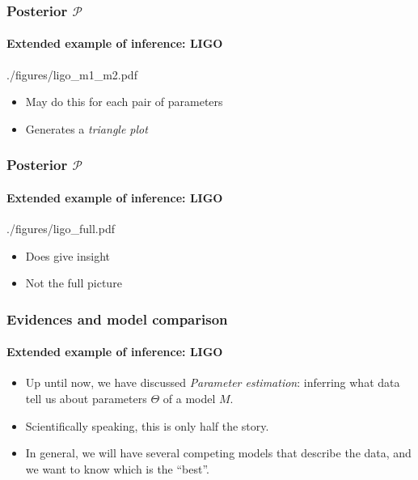 \documentclass[%
]{beamer}
\begin{document}
\begin{frame}
    \frametitle{Posterior $\mathcal{P}$}
    \framesubtitle{Extended example of inference: LIGO}

    \begin{figleft}[0.65]{./figures/ligo_m1_m2.pdf}
        \begin{itemize}
            \item May do this for each pair of parameters
            \item Generates a {\em triangle plot}
        \end{itemize}
    \end{figleft}

\end{frame}

\begin{frame}
    \frametitle{Posterior $\mathcal{P}$}
    \framesubtitle{Extended example of inference: LIGO}
    \begin{figleft}[0.65]{./figures/ligo_full.pdf}
		\begin{itemize}
          \item Does give insight
          \item Not the full picture
		\end{itemize}
    \end{figleft}
\end{frame}

\begin{frame}
    \frametitle{Evidences and model comparison}
    \framesubtitle{Extended example of inference: LIGO}

    \begin{itemize}
        \item Up until now, we have discussed {\em Parameter estimation\/}: inferring what data tell us about parameters $\Theta$ of a model $M$.
        \item Scientifically speaking, this is only half the story.
        \item In general, we will have several competing models that describe the data, and we want to know which is the ``best''.
    \end{itemize}
\end{frame}
\end{document}
